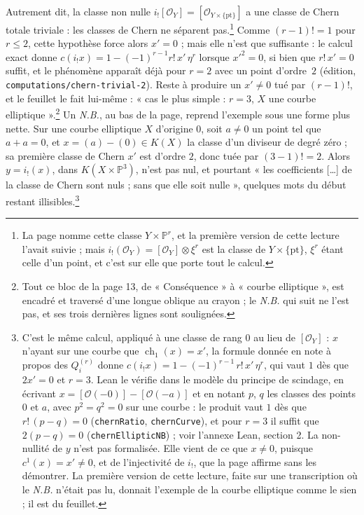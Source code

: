 \documentclass[11pt,a4paper]{article}
\begin{document}
Autrement dit, la classe non nulle $i_{!}[\mathcal{O}_{Y}] =
[\mathcal{O}_{Y \times \{\mathrm{pt}\}}]$ a une classe de Chern totale
triviale : les classes de Chern ne séparent pas.\footnote{La page nomme cette
classe $Y \times \mathbb{P}^{r}$, et la première version de cette lecture
l'avait suivie ; mais $i_{!}(\mathcal{O}_{Y}) = [\mathcal{O}_{Y}] \otimes
\xi^{r}$ est la classe de $Y \times \{\mathrm{pt}\}$, $\xi^{r}$ étant celle
d'un point, et c'est sur elle que porte tout le calcul.} Comme
$(r-1)! = 1$ pour $r \leqslant 2$, cette hypothèse force alors $x' = 0$ ; mais
elle n'est que suffisante : le calcul exact donne
$c(i_!x) = 1 - (-1)^{r-1} r!\,x'\,\eta^r$ lorsque $x'^2 = 0$, si bien que $r!\,x' = 0$
suffit, et le phénomène apparaît déjà pour $r = 2$ avec un point d'ordre~$2$
(édition, \texttt{computations/chern-trivial-2}).
Reste à produire un $x' \neq 0$ tué par $(r-1)!$, et le feuillet le fait
lui-même : « cas le plus simple : $r = 3$, $X$ une courbe elliptique ».\footnote{Tout
ce bloc de la page 13, de « Conséquence » à « courbe elliptique », est encadré
et traversé d'une longue oblique au crayon ; le \emph{N.B.} qui suit ne l'est
pas, et ses trois dernières lignes sont soulignées.} Un \emph{N.B.}, au bas de
la page, reprend l'exemple sous une forme plus nette. Sur une courbe
elliptique $X$ d'origine $0$, soit $a \neq 0$ un point tel que $a + a = 0$, et
$x = (a) - (0) \in K(X)$ la classe d'un diviseur de degré zéro ; sa première
classe de Chern $x'$ est d'ordre $2$, donc tuée par $(3-1)! = 2$. Alors
$y = i_{!}(x)$, dans $K(X \times \mathbb{P}^{3})$, n'est pas nul, et pourtant
« les coefficients […] de la classe de Chern sont nuls ; sans que elle soit
nulle », quelques mots du début restant illisibles.\footnote{C'est le même calcul, appliqué à une classe de rang $0$
au lieu de $[\mathcal{O}_{Y}]$ : $x$ n'ayant sur une courbe que
$\operatorname{ch}_{1}(x) = x'$, la formule donnée en note à propos des $Q^{(r)}_{i}$ donne
$c(i_{!}x) = 1 - (-1)^{r-1}\, r!\, x'\,\eta^{r}$, qui vaut $1$ dès que
$2x' = 0$ et $r = 3$. Lean le vérifie dans le modèle du principe de
scindage, en écrivant $x = [\mathcal{O}(-0)] - [\mathcal{O}(-a)]$ et en
notant $p$, $q$ les classes des points $0$ et $a$, avec $p^{2} = q^{2} = 0$
sur une courbe : le produit vaut $1$ dès que $r!\,(p - q) = 0$
(\texttt{chernRatio}, \texttt{chernCurve}), et pour $r = 3$ il suffit que
$2(p - q) = 0$ (\texttt{chernEllipticNB}) ; voir l'annexe Lean, section 2.
La non-nullité de $y$ n'est pas formalisée. Elle vient de ce que $x \neq 0$,
puisque $c^{1}(x) = x' \neq 0$, et de l'injectivité de $i_{!}$, que la page
affirme sans les démontrer. La première
version de cette lecture, faite sur une transcription où le \emph{N.B.}
n'était pas lu, donnait l'exemple de la courbe elliptique comme le sien ; il
est du feuillet.}
\end{document}
